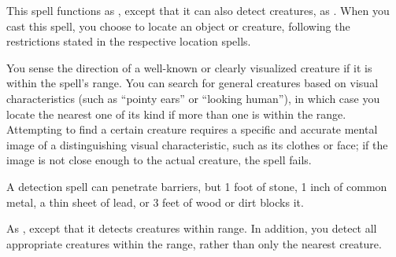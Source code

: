 \begin{spellheader}
\end{spellheader}
\spellrng{\rngext}
\spelldur{\durlong \dismissable}
\spelleffect This spell functions as , except that it can also detect creatures, as . When you cast this spell, you choose to locate an object or creature, following the restrictions stated in the respective location spells.

\begin{spellheader}
    \spellrng{\rnglong}
\end{spellheader}
\begin{spelleffects}
    \spelldur{\durmed \dismissable}
    \spelleffect You sense the direction of a well-known or clearly visualized creature if it is within the spell's range. You can search for general creatures based on visual characteristics (such as ``pointy ears'' or ``looking human''), in which case you locate the nearest one of its kind if more than one is within the range. Attempting to find a certain creature requires a specific and accurate mental image of a distinguishing visual characteristic, such as its clothes or face; if the image is not close enough to the actual creature, the spell fails.
\end{spelleffects}
\begin{spellfooter}
    \spellnotes A detection spell can penetrate barriers, but 1 foot of stone, 1 inch of common metal, a thin sheet of lead, or 3 feet of wood or dirt blocks it.
\end{spellfooter}

\begin{spellheader}
\end{spellheader}
\begin{spelleffects}
    \spellrng{\rngext}
    \spelldur{\durmed \dismissable}
    \spelleffect As , except that it detects creatures within \rngext range. In addition, you detect all appropriate creatures within the range, rather than only the nearest creature.
\end{spelleffects}

